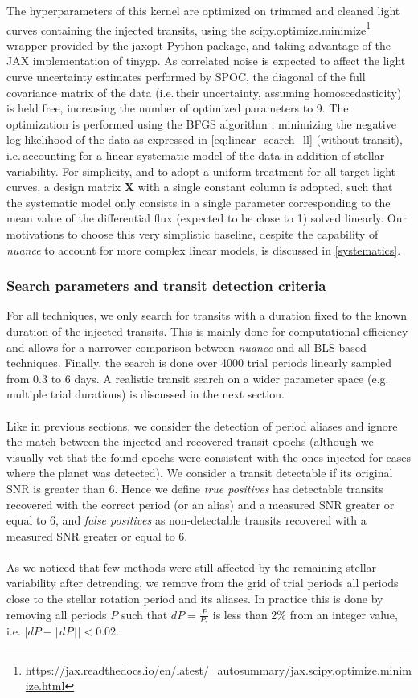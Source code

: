 \documentclass[modern]{aastex631}
\newcommand{\nuancemethod}{\textit{nuance}}
\newcommand{\footlink}[1]{\footnote{\url{#1}}}
\begin{document}
The hyperparameters of this kernel are optimized on trimmed and cleaned light curves containing the injected transits, using the \textsf{scipy.optimize.minimize}\footlink{https://jax.readthedocs.io/en/latest/_autosummary/jax.scipy.optimize.minimize.html} wrapper provided by the \textsf{jaxopt} Python package, and taking advantage of the \textsf{JAX} implementation of \textsf{tinygp}. As correlated noise is expected to affect the light curve uncertainty estimates performed by SPOC, the diagonal of the full covariance matrix of the data (i.e.\,their uncertainty, assuming homoscedasticity) is held free, increasing the number of optimized parameters to 9. The optimization is performed using the \textsf{BFGS} algorithm \citep{Fletcher1987}, minimizing the negative log-likelihood of the data as expressed in \autoref{eq:linear_search_ll} (without transit), i.e.\,accounting for a linear systematic model of the data in addition of stellar variability. For simplicity, and to adopt a uniform treatment for all target light curves, a design matrix $\bm{X}$ with a single constant column is adopted, such that the systematic model only consists in a single parameter corresponding to the mean value of the differential flux (expected to be close to 1) solved linearly. Our motivations to choose this very simplistic baseline, despite the capability of \nuancemethod{} to account for more complex linear models, is discussed in \autoref{systematics}.

\subsubsection*{Search parameters and transit detection criteria}
For all techniques, we only search for transits with a duration fixed to the known duration of the injected transits. This is mainly done for computational efficiency and allows for a narrower comparison between \nuancemethod{} and all BLS-based techniques. Finally, the search is done over 4000 trial periods linearly sampled from 0.3 to 6 days. A realistic transit search on a wider parameter space (e.g. multiple trial durations) is discussed in the next section.\\\\
Like in previous sections, we consider the detection of period aliases and ignore the match between the injected and recovered transit epochs (although we visually vet that the found epochs were consistent with the ones injected for cases where the planet was detected). We consider a transit detectable if its original SNR is greater than 6. Hence we define \textit{true positives} has detectable transits recovered with the correct period (or an alias) and a measured SNR greater or equal to 6, and \textit{false positives} as non-detectable transits recovered with a measured SNR greater or equal to 6.\\\\As we noticed that few methods were still affected by the remaining stellar variability after detrending, we remove from the grid of trial periods all periods close to the stellar rotation period and its aliases. In practice this is done by removing all periods $P$ such that $dP = \frac{P}{P_*}$ is less than 2\% from an integer value, i.e. $\vert  dP - \lceil dP \rceil \vert < 0.02$.
\end{document}
